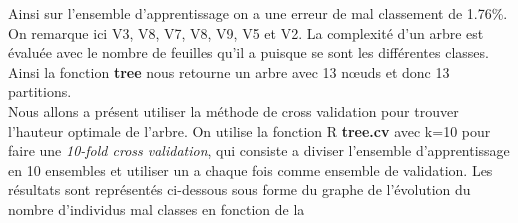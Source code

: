\documentclass[10pt]{article}
\begin{document}
Ainsi sur l'ensemble d'apprentissage on a une erreur de mal classement de 1.76\%. On remarque ici V3, V8, V7, V8, V9, V5 et V2. La  complexité d'un arbre est évaluée avec le nombre de feuilles qu'il a puisque se sont les différentes classes. Ainsi la fonction \textbf{tree} nous retourne un arbre avec 13 nœuds et donc 13 partitions.\\
Nous allons a présent utiliser la méthode de cross validation pour trouver l'hauteur optimale de l'arbre. On utilise la fonction R \textbf{tree.cv} avec k=10 pour faire une \textit{10-fold cross validation}, qui consiste a diviser l'ensemble d'apprentissage en 10 ensembles et utiliser un a chaque fois comme ensemble de validation.  Les résultats sont représentés ci-dessous sous forme du graphe de l'évolution du nombre d'individus mal classes en fonction de la 
\end{document}
